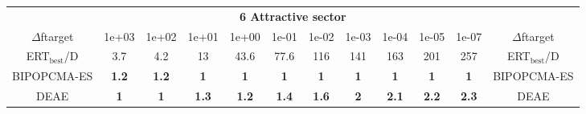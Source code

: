 \begin{tabular}{cccccccccccc}
 & \multicolumn{10}{c}{{\normalsize \textbf{6 Attractive sector}}}\\
$\Delta$ftarget& 1e+03& 1e+02& 1e+01& 1e+00& 1e-01& 1e-02& 1e-03& 1e-04& 1e-05& 1e-07 & $\Delta$ftarget \\
ERT$_{\textrm{best}}$/D& 3.7& 4.2& 13& 43.6& 77.6& 116& 141& 163& 201& 257 & ERT$_{\textrm{best}}$/D \\
\hline
BIPOPCMA-ES & \textbf{1.2} & \textbf{1.2} & \textbf{1} & \textbf{1} & \textbf{1} & \textbf{1} & \textbf{1} & \textbf{1} & \textbf{1} & \textbf{1} & BIPOPCMA-ES \cite{add_an_entry_for_BIPOPCMA-ES_in_bbob.bib}\\
DEAE & \textbf{1} & \textbf{1} & \textbf{1.3} & \textbf{1.2} & \textbf{1.4} & \textbf{1.6} & \textbf{2} & \textbf{2.1} & \textbf{2.2} & \textbf{2.3} & DEAE \cite{add_an_entry_for_DEAE_in_bbob.bib}
\end{tabular}
